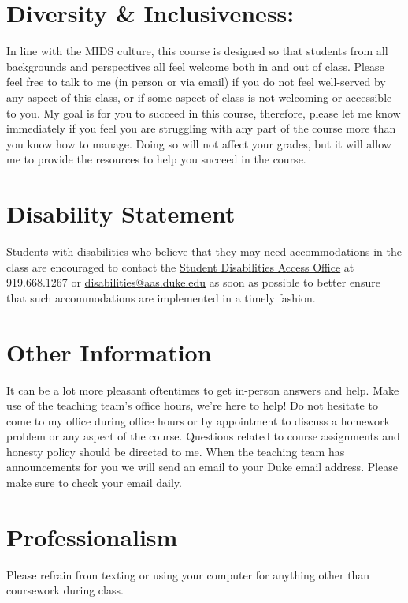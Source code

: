 \documentclass[11pt, a4paper]{article}
\begin{document}
\section{Diversity \& Inclusiveness:}
In line with the MIDS culture, this course is designed so that students from all backgrounds and perspectives all feel welcome both in and out of class. Please feel free to talk to me (in person or via email) if you do not feel well-served by any aspect of this class, or if some aspect of class is not welcoming or accessible to you. My goal is for you to succeed in this course, therefore, please let me know immediately if you feel you are struggling with any part of the course more than you know how to manage. Doing so will not affect your grades, but it will allow me to provide the resources to help you succeed in the course.


\section{Disability Statement} 
Students with disabilities who believe that they may need accommodations in the class are encouraged to contact the \href{https://access.duke.edu/students/staff.php}{Student Disabilities Access Office} at 919.668.1267 or \href{mailto:disabilities@aas.duke.edu}{disabilities@aas.duke.edu}  as soon as possible to better ensure that such accommodations are implemented in a timely fashion.


\section{Other Information} 
It can be a lot more pleasant oftentimes to get in-person answers and help. Make use of the teaching team's office hours, we're here to help! Do not hesitate to come to my office during office hours or by appointment to discuss a homework problem or any aspect of the course.  Questions related to course assignments and honesty policy should be directed to me. When the teaching team has announcements for you we will send an email to your Duke email address. Please make sure to check your email daily.


\section{Professionalism}
Please refrain from texting or using your computer for anything other than coursework during class.
\end{document}
